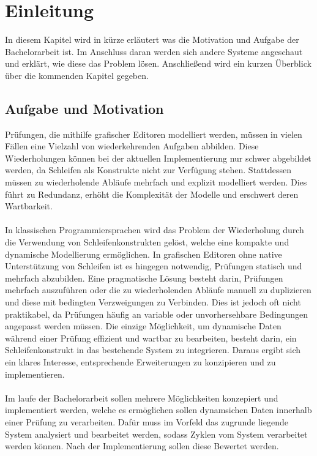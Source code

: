 \documentclass{article}
\begin{document}
    \newpage
    \tableofcontents
    \newpage
    \section{Einleitung}
    In diesem Kapitel wird in kürze erläutert was die Motivation und Aufgabe der Bachelorarbeit ist.
    Im Anschluss daran werden sich andere Systeme angeschaut und erklärt, wie diese das Problem lösen.
    Anschließend wird ein kurzen Überblick über die kommenden Kapitel gegeben.
    \subsection{Aufgabe und Motivation}
    Prüfungen, die mithilfe grafischer Editoren modelliert werden, müssen in vielen Fällen eine Vielzahl von wiederkehrenden Aufgaben abbilden. 
    Diese Wiederholungen können bei der aktuellen Implementierung nur schwer abgebildet werden, da Schleifen als Konstrukte nicht zur Verfügung stehen. 
    Stattdessen müssen zu wiederholende Abläufe mehrfach und explizit modelliert werden. 
    Dies führt zu Redundanz, erhöht die Komplexität der Modelle und erschwert deren Wartbarkeit.\\
    \\
    In klassischen Programmiersprachen wird das Problem der Wiederholung durch die Verwendung von Schleifenkonstrukten gelöst, welche eine kompakte und dynamische Modellierung ermöglichen. 
    In grafischen Editoren ohne native Unterstützung von Schleifen ist es hingegen notwendig, Prüfungen statisch und mehrfach abzubilden. 
    Eine pragmatische Lösung besteht darin, Prüfungen mehrfach auszuführen oder die zu wiederholenden Abläufe manuell zu duplizieren und diese mit bedingten Verzweigungen zu Verbinden. 
    Dies ist jedoch oft nicht praktikabel, da Prüfungen häufig an variable oder unvorhersehbare Bedingungen angepasst werden müssen.
    Die einzige Möglichkeit, um dynamische Daten während einer Prüfung effizient und wartbar zu bearbeiten, besteht darin, ein Schleifenkonstrukt in das bestehende System zu integrieren. 
    Daraus ergibt sich ein klares Interesse, entsprechende Erweiterungen zu konzipieren und zu implementieren.
    \\
    \\
    Im laufe der Bachelorarbeit sollen mehrere Möglichkeiten konzepiert und implementiert werden, welche es ermöglichen sollen dynamsichen Daten innerhalb einer Prüfung zu verarbeiten. 
    Dafür muss im Vorfeld das zugrunde liegende System analysiert und bearbeitet werden, sodass Zyklen vom System verarbeitet werden können.
    Nach der Implementierung sollen diese Bewertet werden.
\end{document}
